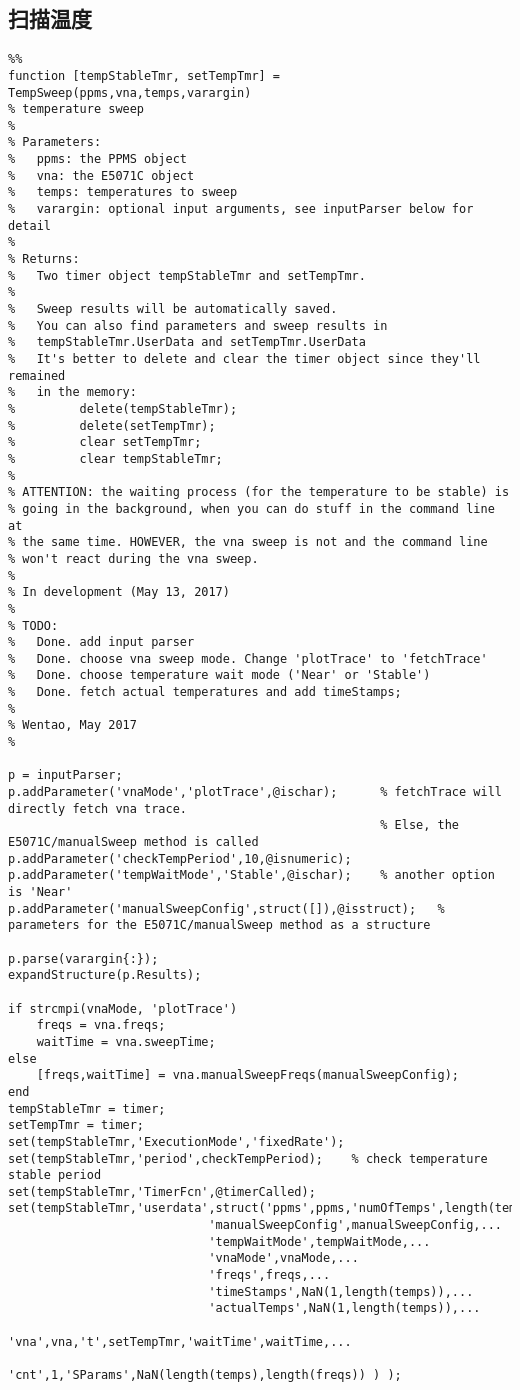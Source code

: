   \subsection{扫描温度} %
  \label{sub:扫描温度}
\begin{lstlisting}
%%
function [tempStableTmr, setTempTmr] = TempSweep(ppms,vna,temps,varargin)
% temperature sweep
%
% Parameters:
%   ppms: the PPMS object
%   vna: the E5071C object
%   temps: temperatures to sweep
%   varargin: optional input arguments, see inputParser below for detail
%
% Returns:
%   Two timer object tempStableTmr and setTempTmr.
% 
%   Sweep results will be automatically saved.
%   You can also find parameters and sweep results in
%   tempStableTmr.UserData and setTempTmr.UserData
%   It's better to delete and clear the timer object since they'll remained
%   in the memory:
%         delete(tempStableTmr);
%         delete(setTempTmr);
%         clear setTempTmr;
%         clear tempStableTmr;
%
% ATTENTION: the waiting process (for the temperature to be stable) is 
% going in the background, when you can do stuff in the command line at
% the same time. HOWEVER, the vna sweep is not and the command line 
% won't react during the vna sweep.
%
% In development (May 13, 2017)
% 
% TODO: 
%   Done. add input parser
%   Done. choose vna sweep mode. Change 'plotTrace' to 'fetchTrace'
%   Done. choose temperature wait mode ('Near' or 'Stable')
%   Done. fetch actual temperatures and add timeStamps;
% 
% Wentao, May 2017
%

p = inputParser;
p.addParameter('vnaMode','plotTrace',@ischar);      % fetchTrace will directly fetch vna trace.
                                                    % Else, the E5071C/manualSweep method is called
p.addParameter('checkTempPeriod',10,@isnumeric);
p.addParameter('tempWaitMode','Stable',@ischar);    % another option is 'Near'
p.addParameter('manualSweepConfig',struct([]),@isstruct);   % parameters for the E5071C/manualSweep method as a structure

p.parse(varargin{:});
expandStructure(p.Results);

if strcmpi(vnaMode, 'plotTrace')
    freqs = vna.freqs;
    waitTime = vna.sweepTime;
else
    [freqs,waitTime] = vna.manualSweepFreqs(manualSweepConfig);
end
tempStableTmr = timer;
setTempTmr = timer;
set(tempStableTmr,'ExecutionMode','fixedRate');
set(tempStableTmr,'period',checkTempPeriod);    % check temperature stable period
set(tempStableTmr,'TimerFcn',@timerCalled);
set(tempStableTmr,'userdata',struct('ppms',ppms,'numOfTemps',length(temps),...
                            'manualSweepConfig',manualSweepConfig,...
                            'tempWaitMode',tempWaitMode,...
                            'vnaMode',vnaMode,...
                            'freqs',freqs,...
                            'timeStamps',NaN(1,length(temps)),...
                            'actualTemps',NaN(1,length(temps)),...
                            'vna',vna,'t',setTempTmr,'waitTime',waitTime,...
                            'cnt',1,'SParams',NaN(length(temps),length(freqs)) ) );


\end{lstlisting}
